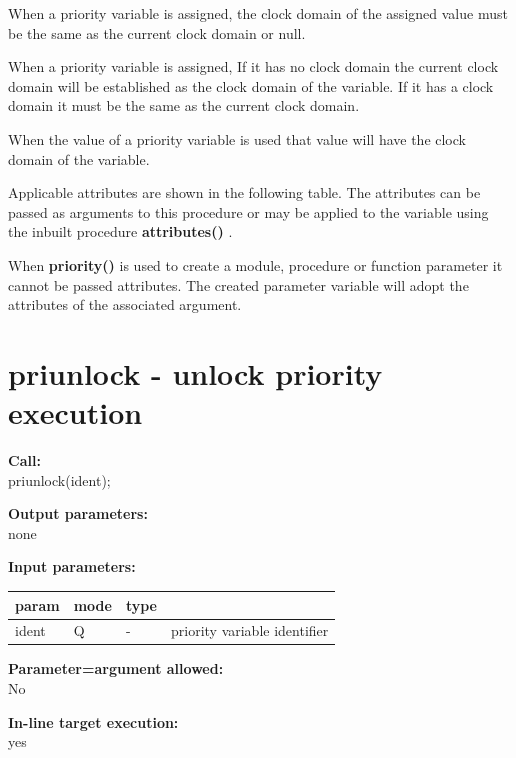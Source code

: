         When a priority variable is assigned, the clock domain of the assigned
        value must be the same as the current clock domain or null.
        
        When a priority variable is assigned, If it has no clock domain the
        current clock domain will be established as the clock domain of the
        variable. If it has a clock domain it must be the same as the current
        clock domain.
        
        When the value of a priority variable is used that value will have the
        clock domain of the variable.
        
        Applicable attributes are shown in the following table. The
        attributes can be passed as arguments to this procedure or may be
        applied to the variable using the inbuilt procedure
        {\bf attributes()} .
        
        When {\bf priority()} is used to create a module, procedure or function
        parameter it cannot be passed attributes. The created parameter variable
        will adopt the attributes of the associated argument.

        




    \section{priunlock - unlock priority execution}\label{sec:ippriunlock}
        
        {\bf Call:} \\
        priunlock(ident);
        
        {\bf Output parameters:} \\
        none
        
        {\bf Input parameters:} \\
        \begin{tabular}{| l | l | l | l |}
        \hline
        param  & mode & type & \\
        \hline \hline
        ident  & Q &  -       & priority variable identifier \\ \hline
        \end{tabular}
        
        {\bf Parameter=argument allowed:} \\
        No
        
        {\bf In-line target execution:} \\
        yes
        
